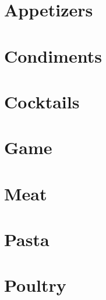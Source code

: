 \documentclass{report}
\begin{document}
    \tableofcontents

    \chapter{Appetizers}

    

    \chapter{Condiments}

    
    

    \chapter{Cocktails}

    
    

    \chapter{Game}

    

    \chapter{Meat}

    
    
    
    
    

    \chapter{Pasta}

    
    
    

    \chapter{Poultry}
\end{document}
